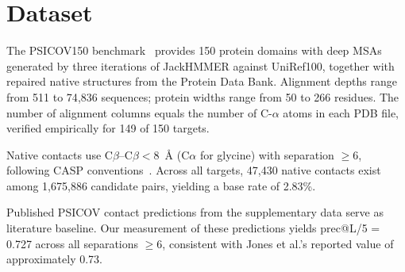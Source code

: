 \section{Dataset}
\label{sec:methods-data}

The PSICOV150 benchmark~\cite{jones2012} provides 150 protein domains with
deep MSAs generated by three iterations of JackHMMER against UniRef100, together
with repaired native structures from the Protein Data Bank.  Alignment depths
range from 511 to 74{,}836 sequences; protein widths range from 50 to 266
residues.  The number of alignment columns equals the number of C-$\alpha$
atoms in each PDB file, verified empirically for 149 of 150 targets.

Native contacts use C$\beta$--C$\beta < 8$~\AA{} (C$\alpha$ for glycine) with
separation $\geq 6$, following CASP conventions~\cite{ezkurdia2009}.  Across
all targets, 47{,}430 native contacts exist among 1{,}675{,}886 candidate
pairs, yielding a base rate of 2.83\%.

Published PSICOV contact predictions from the supplementary data serve as
literature baseline.  Our measurement of these predictions yields prec@L/5 =
0.727 across all separations $\geq 6$, consistent with Jones et al.'s reported
value of approximately 0.73.
